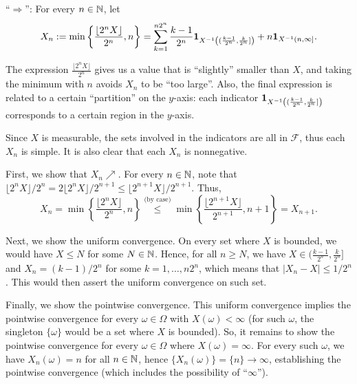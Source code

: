 \begin{enumerate}
\begin{pf}
``\(\Rightarrow\)'': For every \(n\in\mathbb{N}\), let
\[
X_n:=\min\left\{\frac{\lfloor 2^nX\rfloor}{2^n},n\right\}
=\sum_{k=1}^{n2^{n}}\frac{k-1}{2^{n}}\mathbf{1}_{X^{-1}\left((\frac{k-1}{2^{n}},\frac{k}{2^{n}}]\right)}
+n\mathbf{1}_{X^{-1}(n,\infty]}.
\]
\begin{intuition}
The expression \(\frac{\lfloor 2^nX\rfloor}{2^n}\) gives us a value that is
``slightly'' smaller than \(X\), and taking the minimum with \(n\) avoids
\(X_n\) to be ``too large''. Also, the final expression is related to a
certain ``partition'' on the \(y\)-axis: each indicator
\(\mathbf{1}_{X^{-1}\left((\frac{k-1}{2^{n}},\frac{k}{2^{n}}]\right)}\) corresponds
to a certain region in the \(y\)-axis.
\end{intuition}

Since \(X\) is measurable, the sets involved in the indicators are all in
\(\mathcal{F}\), thus each \(X_n\) is simple. It is also clear that each
\(X_n\) is nonnegative.

First, we show that \(X_n\nearrow\).
For every \(n\in\mathbb{N}\), note that \(\lfloor 2^nX\rfloor/2^n=
2\lfloor 2^nX\rfloor/2^{n+1}\le \lfloor 2^{n+1}X\rfloor/2^{n+1}\). Thus,
\[
X_n=\min\left\{\frac{\lfloor 2^nX\rfloor}{2^n},n\right\}
\overset{\text{(by case)}}{\le}\min\left\{\frac{\lfloor 2^{n+1}X\rfloor}{2^{n+1}},n+1\right\}
=X_{n+1}.
\]

Next, we show the uniform convergence.  On every set where \(X\) is bounded, we
would have \(X\le N\) for some \(N\in\mathbb{N}\). Hence, for all \(n\ge N\), we have
\(X\in (\frac{k-1}{2^{n}},\frac{k}{2^{n}}]\) and \(X_n=(k-1)/2^{n}\) for some
\(k=1,\dotsc,n2^{n}\), which means that \(|X_n-X|\le 1/2^{n}\). This would then
assert the uniform convergence on such set.

Finally, we show the pointwise convergence. This uniform convergence implies
the pointwise convergence for every \(\omega\in\Omega\) with
\(X(\omega)<\infty\) (for such \(\omega\), the singleton \(\{\omega\}\) would
be a set where \(X\) is bounded). So, it remains to show the pointwise
convergence for every \(\omega\in\Omega\) where \(X(\omega)=\infty\). For every
such \(\omega\), we have \(X_n(\omega)=n\) for all \(n\in\mathbb{N}\), hence
\(\{X_n(\omega)\}=\{n\}\to\infty\), establishing the pointwise convergence
(which includes the possibility of ``\(\infty\)'').
\end{pf}


\end{enumerate}
